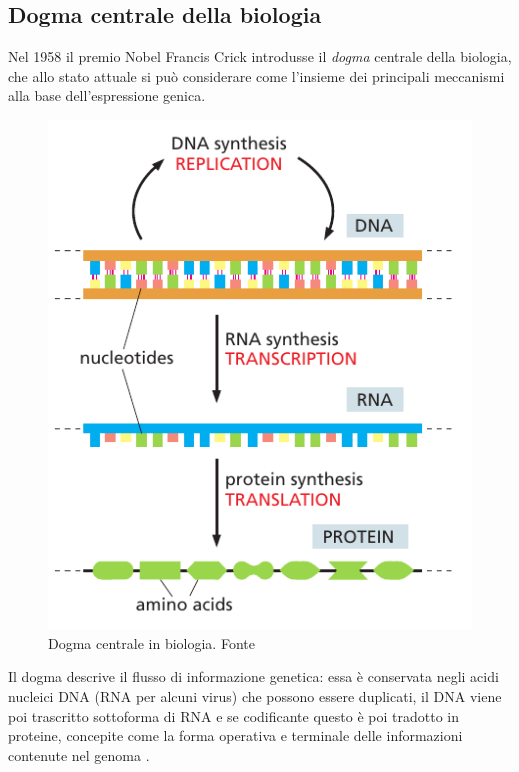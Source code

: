 \subsection{Dogma centrale della biologia}

Nel 1958 il premio Nobel Francis Crick introdusse il \textit{dogma} centrale della biologia, che allo stato attuale si può considerare come l'insieme dei principali meccanismi alla base dell'espressione genica. 

\begin{figure}[h]
	\centering
	\includegraphics[scale=0.45]{images/central-dogma.png}
	\caption{Dogma centrale in biologia. Fonte \cite{alberts2018essential}}
	\label{fig:central-dogma}
\end{figure}

Il dogma descrive il flusso di informazione genetica: essa è conservata negli acidi nucleici DNA (RNA per alcuni virus) che possono essere duplicati, il DNA viene poi trascritto sottoforma di RNA e se codificante questo è poi tradotto in proteine, concepite come la forma operativa e terminale delle informazioni contenute nel genoma \supercite{dogma-wiki}.

